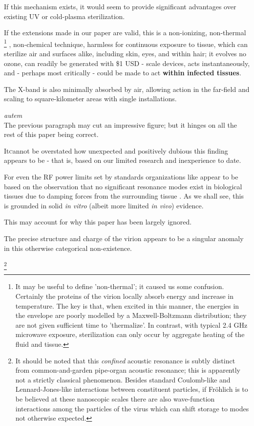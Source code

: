 \documentclass[fleqn,10pt]{article}
\begin{document}
\begin{multicols}{1}
If this mechanism exists, it would seem to provide significant advantages over existing UV or cold-plasma sterilization. 

If the extensions made in our paper are valid, this is a non-ionizing, non-thermal
%
\footnote{It may be useful to define 'non-thermal'; it caused us some confusion. Certainly the proteins of the virion locally absorb energy and increase in temperature. The key is that, when excited in this manner, the energies in the envelope are poorly modelled by a Maxwell-Boltzmann distribution; they are not given sufficient time to 'thermalize'. In contrast, with typical 2.4 GHz microwave exposure, sterilization can only occur by aggregate heating of the fluid and tissue.} 
%
, non-chemical technique, harmless for continuous exposure to tissue, which can sterilize air and surfaces alike, including skin, eyes, and within hair; it evolves no ozone, can readily be generated with \$1 USD - scale devices, acts instantaneously, and - perhaps most critically - could be made to act {\bf within infected tissues}.

The X-band is also minimally absorbed by air, allowing action in the far-field and scaling to square-kilometer areas with single installations.

\begin{autem}

{\it autem}\\
The previous paragraph may cut an impressive figure; but it hinges on all the rest of this paper being correct.

\end{autem}

\lettrine{It} cannot be overstated how unexpected and positively dubious this finding appears to be - that is, based on our limited research and inexperience to date.

For even the RF power limits set by standards organizations like \cite{ICNIRP2020} \cite{IEEE2006} appear to be based on the observation that no significant resonance modes exist in biological tissues due to damping forces from the surrounding tissue \cite{Vibrational2002}. As we shall see, this is grounded in solid {\it in vitro} (albeit more limited {\it in vivo}) evidence. 

This may account for why this paper has been largely ignored.

The precise structure and charge of the virion appears to be a singular anomaly in this otherwise categorical non-existence.


\footnote{It should be noted that this {\it confined} acoustic resonance is subtly distinct from common-and-garden pipe-organ acoustic resonance; this is apparently not a strictly classical phenomenon. Besides standard Coulomb-like and Lennard-Jones-like interactions between constituent particles, if Fr\"{o}hlich is to be believed at these nanoscopic scales there are also wave-function interactions among the particles of the virus which can shift storage to modes not otherwise expected.

}
\end{multicols}
\end{document}
